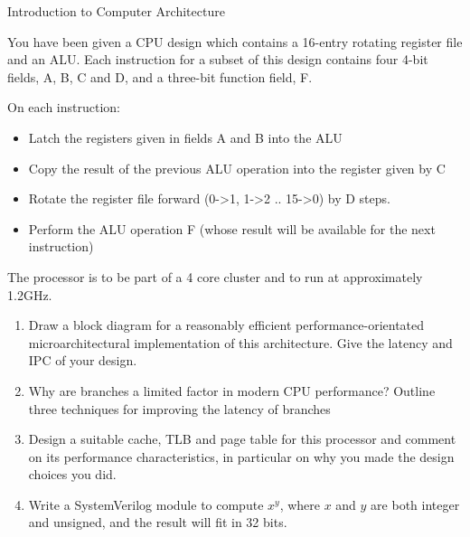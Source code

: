 \documentclass{tripos}  %
\begin{document}
\begin{question}[MockIA,year=2024,paper=2,question=5,author=rrw]{Introduction to Computer Architecture}


You have been given a CPU design which contains a 16-entry rotating register file and an ALU.
Each instruction for a subset of this design contains four 4-bit fields, A, B, C and D,
and a three-bit function field, F.

On each instruction:

\begin{itemize}
\item Latch the registers given in fields A and B into the ALU
\item Copy the result of the previous ALU operation into the register given by C
\item Rotate the register file forward (0->1, 1->2 .. 15->0) by D steps.
\item Perform the ALU operation F (whose result will be available for the next instruction)
\end{itemize}

The processor is to be part of a 4 core cluster and to run at approximately 1.2GHz.

\begin{enumerate}
\item Draw a block diagram for a reasonably efficient performance-orientated microarchitectural implementation of this architecture. Give the latency and IPC of your design. 
\item Why are branches a limited factor in modern CPU performance? Outline three techniques for improving the latency of branches 
\item Design a suitable cache, TLB and page table for this processor and comment on its performance characteristics, in particular on why you made the design choices you did. 
\item Write a SystemVerilog module to compute $x^y$, where $x$ and $y$ are both integer and unsigned, and the result will fit in 32 bits. 
\end{enumerate}
\end{question}
\end{document}
